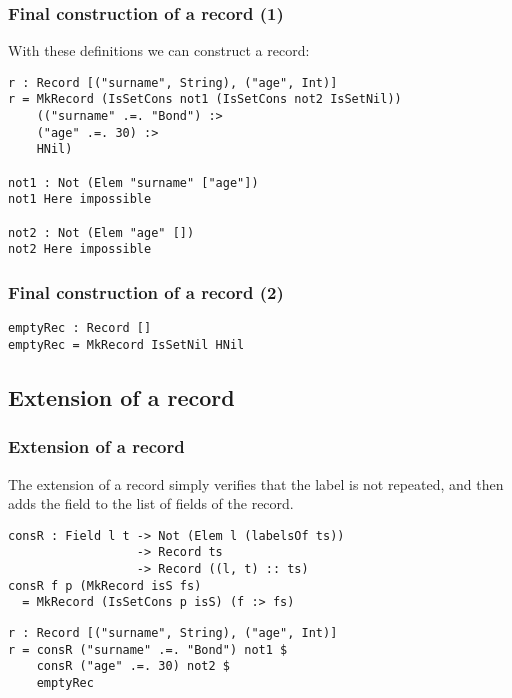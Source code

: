\documentclass{beamer}
\begin{document}
\begin{frame}[fragile]
\frametitle{Final construction of a record (1)}

With these definitions we can construct a record:

\begin{example}
\begin{verbatim}
r : Record [("surname", String), ("age", Int)]
r = MkRecord (IsSetCons not1 (IsSetCons not2 IsSetNil)) 
    (("surname" .=. "Bond") :>
    ("age" .=. 30) :>
    HNil)

not1 : Not (Elem "surname" ["age"])
not1 Here impossible

not2 : Not (Elem "age" [])
not2 Here impossible
\end{verbatim}
\end{example}
\end{frame}

\begin{frame}[fragile]
\frametitle{Final construction of a record (2)}

\begin{example}
\begin{verbatim}
emptyRec : Record []
emptyRec = MkRecord IsSetNil HNil
\end{verbatim}
\end{example}

\end{frame}

\subsection{Extension of a record}

\begin{frame}[fragile]
\frametitle{Extension of a record}

The extension of a record simply verifies that the label is not repeated, and then adds the field to the list of fields of the record.

\pause

\begin{definition}
\begin{verbatim}
consR : Field l t -> Not (Elem l (labelsOf ts))
                  -> Record ts
                  -> Record ((l, t) :: ts)
consR f p (MkRecord isS fs)
  = MkRecord (IsSetCons p isS) (f :> fs)
\end{verbatim}
\end{definition}

\pause
\begin{example}
\begin{verbatim}
r : Record [("surname", String), ("age", Int)]
r = consR ("surname" .=. "Bond") not1 $
    consR ("age" .=. 30) not2 $
    emptyRec
\end{verbatim}
\end{example}
\end{frame}
\end{document}
